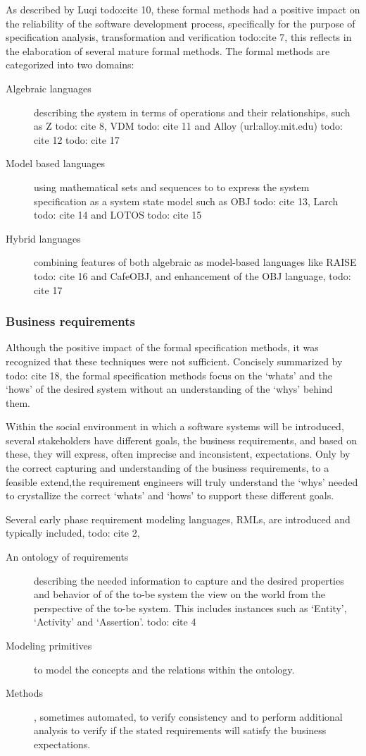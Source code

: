 As described by  Luqi todo:cite 10, these formal methods had a positive impact on the reliability of the software development process, specifically for the purpose of specification analysis, transformation and verification todo:cite 7, this  reflects  in the elaboration of several mature formal methods.
The formal methods are categorized into two domains:

\begin{description}
	\item[Algebraic languages] describing the system in terms of operations and their relationships, such as Z todo: cite 8, VDM todo: cite 11  and Alloy (url:alloy.mit.edu) todo: cite 12 todo: cite 17
	\item[Model based languages] using mathematical sets and sequences to to express the system specification as a system state model such as OBJ todo: cite 13, Larch todo: cite 14 and LOTOS todo: cite 15
	\item[Hybrid languages] combining features of both algebraic as model-based languages like RAISE todo: cite 16 and CafeOBJ, and enhancement of the OBJ language, todo: cite 17
\end{description}

\subsubsection{Business requirements}

Although the positive impact of the formal specification methods, it was recognized that these techniques were not sufficient. Concisely summarized by todo: cite 18, the formal specification methods focus on the `whats' and the  `hows' of the desired system without an understanding of the `whys' behind them. 

Within the social environment in which a software systems will be introduced, several stakeholders have different goals, the business requirements, and based on these, they will express, often imprecise and inconsistent, expectations. Only by the correct capturing and understanding of the business requirements, to a feasible extend,the requirement engineers will truly understand the `whys' needed to crystallize the correct  `whats' and  `hows' to support these different goals.

Several early phase requirement modeling languages, RMLs, are introduced and typically included, todo: cite 2, 
\begin{description}
	\item[An ontology of requirements] describing the needed information to capture and the desired properties and behavior of of the to-be system the view on the world from the perspective of the to-be system. This includes instances such as `Entity', `Activity' and `Assertion'. todo: cite 4
	\item[Modeling primitives] to model the concepts and the relations within the ontology.
	\item[Methods], sometimes automated, to verify consistency and to perform additional analysis to verify if the stated requirements will satisfy the business expectations.
\end{description}

